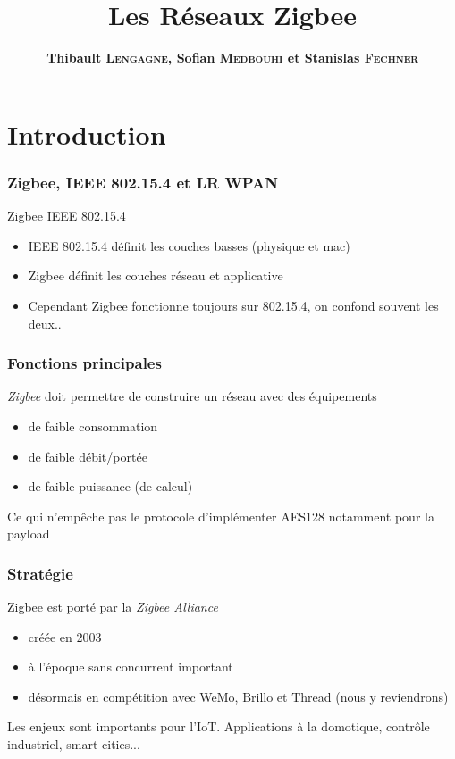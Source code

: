 \documentclass{beamer}
\title[Les Réseaux Zigbee]{Les Réseaux Zigbee}
\author{\textbf{Thibault \textsc{Lengagne}, Sofian \textsc{Medbouhi} et Stanislas \textsc{Fechner}}}
\institute{Centrale Supélec - Campus de Rennes}
\begin{document}
  \begin{frame}
    \titlepage
  \end{frame}
  

\section{Introduction}
  \begin{frame}
   \frametitle{Zigbee, IEEE 802.15.4 et LR WPAN}
   \begin{block}{Zigbee IEEE 802.15.4}
   \begin{itemize}
	   \item IEEE 802.15.4 définit les couches basses (physique et mac)
	   \item Zigbee définit les couches réseau et applicative
	   \item Cependant Zigbee fonctionne toujours sur 802.15.4, on confond souvent les deux..
   \end{itemize}
   \end{block}
  \end{frame}

\begin{frame}
   \frametitle{Fonctions principales}

   \begin{block}{\textit{Zigbee} doit permettre de construire un réseau avec des équipements}
   \begin{itemize}
    \item de faible consommation
    \item de faible débit/portée
    \item de faible puissance (de calcul)
   \end{itemize}
   Ce qui n'empêche pas le protocole d'implémenter AES128 notamment pour la payload
	\end{block}
  \end{frame}

  \begin{frame}
     \frametitle{Stratégie}
	 \begin{block}{Zigbee est porté par la \textit{Zigbee Alliance}}
	    \begin{itemize}
		    \item créée en 2003
		    \item à l'époque sans concurrent important
		    \item désormais en compétition avec WeMo, Brillo et Thread (nous y reviendrons)
	    \end{itemize}
	    Les enjeux sont importants pour l'IoT. Applications à la domotique, contrôle industriel, smart cities...
	\end{block}
  \end{frame}
\end{document}
